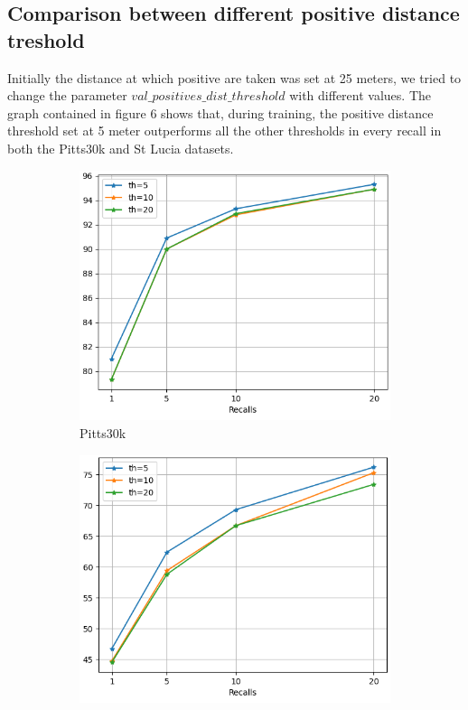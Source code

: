 \documentclass[10pt,twocolumn,letterpaper]{article}
\begin{document}
\subsection{Comparison between different positive distance treshold}
Initially the distance at which positive are taken was set at 25 meters, we tried to change the parameter ${val\_positives\_dist\_threshold}$ with different values. The graph contained in figure 6 shows that, during training, the positive distance threshold set at 5 meter outperforms all the other thresholds in every recall in both the Pitts30k and St Lucia datasets.\\
\begin{figure}[!h]
	\centering
	\begin{subfigure}[b]{0.23\textwidth}
		\centering
		\includegraphics[width=\textwidth]{img/train_th/test_pitts30k_recalls_graph.png}
		\caption{Pitts30k}
		\label{fig:recalls:train_th:pitts30k}
	\end{subfigure}
	\hfill
	\begin{subfigure}[b]{0.23\textwidth}
		\centering
		\includegraphics[width=\textwidth]{img/train_th/test_st_lucia_recalls_graph.png}

\end{subfigure}
\end{figure}
\end{document}
